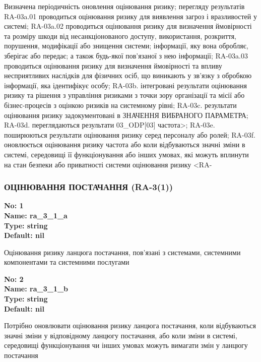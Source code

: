 \documentclass{article}
\begin{document}
{\footnotesize Визначена періодичність оновлення оцінювання ризику; перегляду результатів RA-03a.01 проводиться оцінювання ризику для виявлення загроз і вразливостей у системі; RA-03a.02 проводиться оцінювання ризику для визначення ймовірності та розміру шкоди від несанкціонованого доступу, використання, розкриття, порушення, модифікації або знищення системи; інформації, яку вона обробляє, зберігає або передає; а також будь-якої пов'язаної з нею інформації; RA-03a.03 проводиться оцінювання ризику для визначення ймовірності та впливу несприятливих наслідків для фізичних осіб, що виникають у зв'язку з обробкою інформації, яка ідентифікує особу; RA-03b. інтегровані результати оцінювання ризику та рішення з управління ризиками з точки зору організації та місії або бізнес-процесів з оцінкою ризиків на системному рівні; RA-03c. результати оцінювання ризику задокументовані в ЗНАЧЕННЯ ВИБРАНОГО ПАРАМЕТРА; RA-03d. переглядаються результати 03\_\allowbreak{}ODP[03] частота>; RA-03e. поширюються результати оцінювання ризику серед персоналу або ролей; RA-03f. оновлюється оцінювання ризику частота або коли відбуваються значні зміни в системі, середовищі її функціонування або інших умовах, які можуть вплинути на стан безпеки або приватності системи оцінювання ризику <RA-}




\subsubsection{ОЦІНЮВАННЯ ПОСТАЧАННЯ (RA-3(1))}


\vspace{10pt}
{\footnotesize\bfseries
No: 1\\
Name: ra\_\allowbreak{}3\_\allowbreak{}1\_\allowbreak{}a\\
Type: string\\
Default: nil
}

{\footnotesize Оцінювання ризику ланцюга постачання, пов'язані з системами, системними компонентами та системними послугами}


{\footnotesize\bfseries
No: 2\\
Name: ra\_\allowbreak{}3\_\allowbreak{}1\_\allowbreak{}b\\
Type: string\\
Default: nil
}

{\footnotesize Потрібно оновлювати оцінювання ризику ланцюга постачання, коли відбуваються значні зміни у відповідному ланцюгу постачання, або коли зміни в системі, середовищі функціонування чи інших умовах можуть вимагати змін у ланцюгу постачання}
\end{document}
